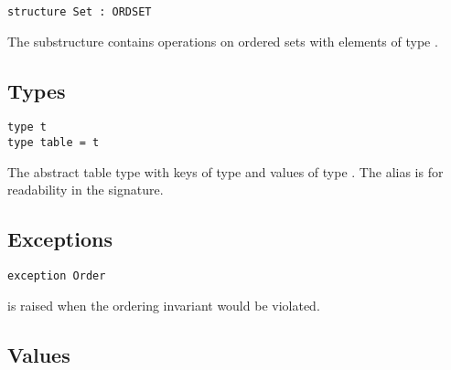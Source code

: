 \begin{cluster}
\label{grp:grm:aug-ordtable-interface::set}

\begin{gram}[Set]
\label{grm:aug-ordtable-interface::set}
\begin{verbatim}
structure Set : ORDSET
\end{verbatim}
The  substructure contains operations on ordered sets with elements of
type .

\end{gram}
\end{cluster}


\subsection{Types}
\label{sec:aug-ordtable-interface::types}

\begin{cluster}
\label{grp:grm:aug-ordtable-interface::type}

\begin{gram}
\label{grm:aug-ordtable-interface::type}
\begin{verbatim}
type t
type table = t
\end{verbatim}
The abstract table type with keys of type  and values of type
. The alias  is for readability in the signature.

\end{gram}
\end{cluster}


\subsection{Exceptions}
\label{sec:aug-ordtable-interface::exceptions}

\begin{cluster}
\label{grp:grm:aug-ordtable-interface::exception}

\begin{gram}
\label{grm:aug-ordtable-interface::exception}
\begin{verbatim}
exception Order
\end{verbatim}
 is raised when the ordering invariant would be violated.

\end{gram}
\end{cluster}


\subsection{Values}
\label{sec:aug-ordtable-interface::values}

